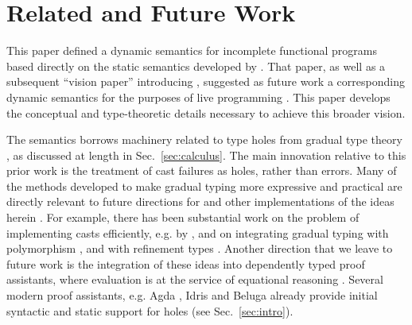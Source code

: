 \vspace{-5px}
\newcommand{\relatedWorkSection}{Related and Future Work}
\section{\protect\relatedWorkSection} %
\label{sec:relatedWork}
\vspace{-2px}

This paper defined a dynamic semantics for incomplete functional programs
based directly on the static semantics developed by \citet{popl-paper}. That paper, as well as a subsequent ``vision paper'' introducing \Hazel, suggested as future work  
a corresponding dynamic semantics for the purposes of live programming \cite{HazelnutSNAPL}. 
This paper    
develops the conceptual and type-theoretic details necessary to achieve this broader vision.

The semantics borrows machinery related to type holes from gradual type theory \cite{Siek06a,DBLP:conf/snapl/SiekVCB15}, as discussed
at length in Sec.~\ref{sec:calculus}. The main innovation relative to this
prior work is the treatment of cast failures as holes, rather than errors.
Many of the methods developed to make gradual typing more expressive and practical are directly relevant to future directions for \Hazel and other implementations of the ideas herein \cite{takikawa_et_al:LIPIcs:2015:5215}. For example, there has been substantial work on the problem of implementing casts efficiently, e.g. by \citet{herman2010space}, and on integrating gradual typing with polymorphism \cite{DBLP:conf/esop/XieBO18,Igarashi:2017:PGT:3136534.3110284}, and with refinement types \cite{DBLP:conf/popl/LehmannT17}. Another direction that we leave to future work is the integration of these ideas into dependently typed proof assistants, 
where evaluation is at the service of equational reasoning \cite{DBLP:journals/corr/abs-1009-2789}. Several modern proof assistants, e.g. Agda \cite{norell2009dependently,norell:thesis}, Idris \cite{brady2013idris} and Beluga \cite{DBLP:conf/flops/Pientka10} already provide initial syntactic and static support for holes (see Sec.~\ref{sec:intro}).

